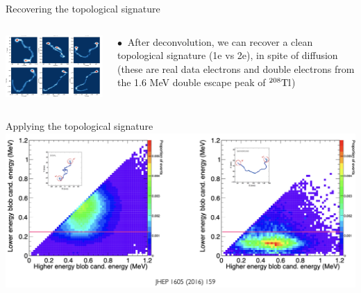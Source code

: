 \documentclass [aspectratio=169]{beamer}
\newcommand{\TL}{\ensuremath{{}^{208}{\rm Tl}}}
\begin{document}
\begin{frame}{Recovering the topological signature}
\begin{columns}
\includegraphics[scale=0.50]{deconv1e2e.png}

$\bullet~$ After deconvolution, we can recover a clean topological signature (1e vs 2e), in spite of diffusion (these are real data electrons and double electrons from the 1.6 MeV double escape peak of \TL) 
 \end{columns}
\end{frame}

\begin{frame}{Applying the topological signature}
\includegraphics[scale=0.30]{topoNew.png}

\end{frame}
\end{document}
